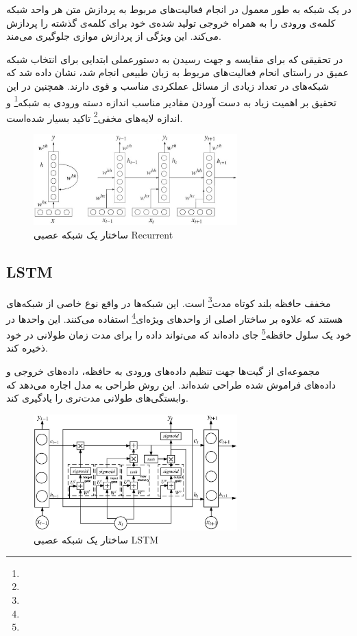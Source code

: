 \documentclass[12pt, a4paper, oneside]{report}
\begin{document}
در یک شبکه
به طور معمول در انجام فعالیت‌های مربوط به پردازش متن هر واحد شبکه کلمه‌ی ورودی را به همراه
خروجی تولید شده‌ی خود برای کلمه‌ی گذشته را پردازش می‌کند. این ویژگی از پردازش موازی جلوگیری می‌مند\cite{iyyer-etal-2015-deep}.

در تحقیقی که برای مقایسه
و
جهت رسیدن به دستورعملی ابتدایی برای انتخاب شبکه عمیق در راستای انحام فعالیت‌های مربوط به زبان طبیعی
انجام شد، نشان داده شد که شبکه‌های
در تعداد زیادی از مسائل عملکردی مناسب و قوی دارند. همچنین در این تحقیق بر اهمیت زیاد به دست آوردن
مقادیر مناسب
اندازه دسته ورودی به شبکه\footnote{}
و
اندازه لایه‌های مخفی\footnote{}
تاکید بسیار شده‌است\cite{8844895}.

\begin{figure}[!ht]
    \centering
    \includegraphics[width=0.7\textwidth]{rnn}
    \caption{ساختار یک شبکه عصبی Recurrent}
    \label{fig:rnn}
\end{figure}

\subsection{LSTM}

مخفف
حافظه بلند کوتاه مدت\footnote{}
است. این شبکه‌ها در واقع نوع خاصی از شبکه‌های
هستند که علاوه بر ساختار اصلی از 
واحد‌های ویژه‌ای\footnote{}
استفاده می‌کنند. این واحدها در خود یک 
سلول حافظه\footnote{}
جای داده‌اند که می‌تواند داده را برای مدت زمان طولانی در خود ذخیره کند.

مجموعه‌ای از گیت‌ها جهت تنظیم داده‌های ورودی به حافظه، داده‌های خروجی و داده‌های فراموش شده طراحی
شده‌اند. این روش طراحی به مدل اجاره می‌دهد که وابستگی‌های طولانی مدت‌تری را یادگیری کند\cite{8844895}.

\begin{figure}[!ht]
    \centering
    \includegraphics[width=0.7\textwidth]{lstm}
    \caption{ساختار یک شبکه عصبی LSTM}
    \label{fig:lstm}
\end{figure}
\end{document}
